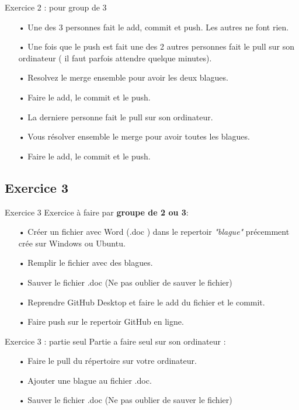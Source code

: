 \documentclass{beamer}
\begin{document}
\begin{frame}{Exercice 2 : pour group de 3}
    \begin{itemize}
    \item[•] Une des 3 personnes fait le add, commit et push. Les autres ne font rien.
    \item[•] Une fois que le push est fait une des 2 autres personnes fait le pull sur son ordinateur ( il faut parfois attendre quelque minutes).
    \item[•] Resolvez le merge ensemble pour avoir les deux blagues.
    \item[•] Faire le add, le commit et le push.
    \item[•] La derniere personne fait le pull sur son ordinateur.
    \item[•] Vous résolver ensemble le merge pour avoir toutes les blagues.
    \item[•] Faire le add, le commit et le push.
    \end{itemize}
\end{frame}
\subsection{Exercice 3}
\begin{frame}{Exercice 3}
    Exercice à faire par \textbf{groupe de 2 ou 3}:
    \begin{itemize}
    \item[•] Créer un fichier avec Word (.doc ) dans le repertoir \textit{"blague"} précemment crée sur Windows ou Ubuntu.
    \item[•] Remplir le fichier avec des blagues.
    \item[•] Sauver le fichier .doc (Ne pas oublier de sauver le fichier)
    \item[•] Reprendre GitHub Desktop et faire le add du fichier et le commit.
    \item[•] Faire push sur le repertoir GitHub en ligne.
    \end{itemize}
\end{frame}

\begin{frame}{Exercice 3 : partie seul}
    Partie a faire seul sur son ordinateur :
    \begin{itemize}
    \item[•] Faire le pull du répertoire sur votre ordinateur.
    \item[•] Ajouter une blague au fichier .doc.
    \item[•] Sauver le fichier .doc (Ne pas oublier de sauver le fichier)
    \end{itemize}
\end{frame}
\end{document}
